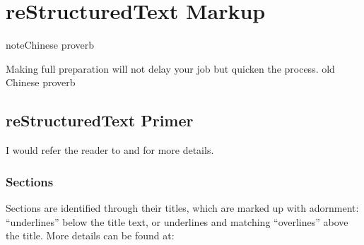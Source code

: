 \documentclass[letterpaper,12pt,english]{sphinxmanual}
\begin{document}
\begin{sphinxVerbatim}[commandchars=\\\{\}]
     \PYG{p}{[}\PYG{p}{]}
        \PYG{p}{[}\PYG{p}{]}  \PYG{p}{[} \PYG{p}{]}
         


    \PYG{p}{[}\PYG{p}{]}  



\end{sphinxVerbatim}


\chapter{reStructuredText Markup}
\label{\detokenize{rtxt:restructuredtext-markup}}\label{\detokenize{rtxt:rtext}}\label{\detokenize{rtxt::doc}}
\begin{sphinxadmonition}{note}{Chinese proverb}

Making full preparation will not delay your job but quicken the process. \textendash{} old Chinese proverb
\end{sphinxadmonition}


\section{reStructuredText Primer}
\label{\detokenize{rtxt:restructuredtext-primer}}
I would refer the reader to  and  for more details.


\subsection{Sections}
\label{\detokenize{rtxt:sections}}
Sections are identified through their titles, which are marked up with adornment: “underlines” below the title text, or underlines and matching “overlines” above the title. More details can be found at: 
\end{document}
